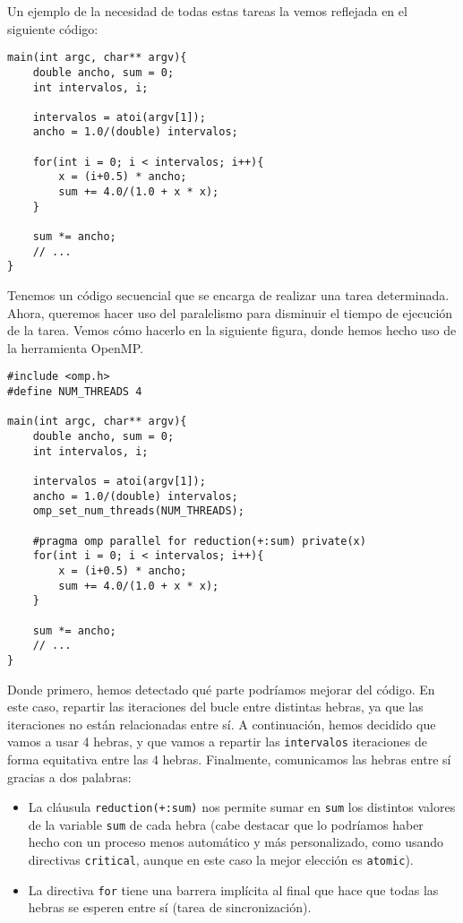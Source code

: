 Un ejemplo de la necesidad de todas estas tareas la vemos reflejada en el siguiente código:
    \begin{verbatim}
main(int argc, char** argv){
    double ancho, sum = 0;
    int intervalos, i;
    
    intervalos = atoi(argv[1]);
    ancho = 1.0/(double) intervalos;

    for(int i = 0; i < intervalos; i++){
        x = (i+0.5) * ancho;
        sum += 4.0/(1.0 + x * x);
    }

    sum *= ancho;
    // ...
}
    \end{verbatim}
\label{codigo_pi}
Tenemos un código secuencial que se encarga de realizar una tarea determinada. Ahora, queremos hacer uso del paralelismo para disminuir el tiempo de ejecución de la tarea. Vemos cómo hacerlo en la siguiente figura, donde hemos hecho uso de la herramienta OpenMP.
    \begin{verbatim}
#include <omp.h>
#define NUM_THREADS 4

main(int argc, char** argv){
    double ancho, sum = 0;
    int intervalos, i;
    
    intervalos = atoi(argv[1]);
    ancho = 1.0/(double) intervalos;
    omp_set_num_threads(NUM_THREADS);

    #pragma omp parallel for reduction(+:sum) private(x)
    for(int i = 0; i < intervalos; i++){
        x = (i+0.5) * ancho;
        sum += 4.0/(1.0 + x * x);
    }

    sum *= ancho;
    // ...
}
    \end{verbatim}
Donde primero, hemos detectado qué parte podríamos mejorar del código. En este caso, repartir las iteraciones del bucle entre distintas hebras, ya que las iteraciones no están relacionadas entre sí. A continuación, hemos decidido que vamos a usar 4 hebras, y que vamos a repartir las \verb|intervalos| iteraciones de forma equitativa entre las 4 hebras. Finalmente, comunicamos las hebras entre sí gracias a dos palabras:
\begin{itemize}
    \item La cláusula \verb|reduction(+:sum)| nos permite sumar en \verb|sum| los distintos valores de la variable \verb|sum| de cada hebra (cabe destacar que lo podríamos haber hecho con un proceso menos automático y más personalizado, como usando directivas \verb|critical|, aunque en este caso la mejor elección es \verb|atomic|).
    \item La directiva \verb|for| tiene una barrera implícita al final que hace que todas las hebras se esperen entre sí (tarea de sincronización).
\end{itemize}

